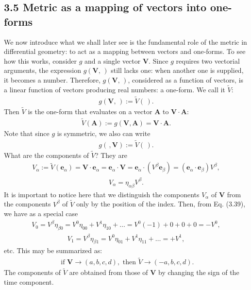 \documentclass[11pt,letterpaper]{book}
\begin{document}
    \subsection{3.5 Metric as a mapping of vectors into one-forms}
    We now introduce what we shall later see is the fundamental role of the metric in differential geometry: to act as a mapping between vectors and one-forms. To see how this works, consider \(g\) and a single vector \(\mathbf{V}\). Since \(g\) requires two vectorial arguments, the expression \(g(\mathbf{V}, \,)\) still lacks one: when another one is supplied, it becomes a number. Therefore, \(g(\mathbf{V}, \,)\), considered as a function of vectors, is a linear function of vectors producing real numbers: a one-form. We call it \(\tilde{V}\):
    \begin{align}
    g(\mathbf{V}, \,) := \tilde{V}( \,). \tag{3.37}
    \end{align}
    Then \(\tilde{V}\) is the one-form that evaluates on a vector \(\mathbf{A}\) to \(\mathbf{V} \cdot \mathbf{A}\):
    \begin{align}
    \tilde{V}(\mathbf{A}) := g(\mathbf{V},\mathbf{A}) = \mathbf{V} \cdot \mathbf{A}. \tag{3.38}
    \end{align}
    Note that since \(g\) is symmetric, we also can write
    \begin{align}
    g( \,, \mathbf{V}) := \tilde{V}( \,).
    \end{align}
    What are the components of \(\tilde{V}\)? They are
    \begin{align}
    V_\alpha := \tilde{V}(\mathbf{e}_\alpha) = \mathbf{V} \cdot \mathbf{e}_\alpha = \mathbf{e}_\alpha \cdot \mathbf{V}
    = \mathbf{e}_\alpha \cdot (V^\beta \mathbf{e}_\beta)
    = (\mathbf{e}_\alpha \cdot \mathbf{e}_\beta)V^\beta,
    \end{align}
    \begin{align}
    V_\alpha = \eta_{\alpha\beta}V^\beta. \tag{3.39}
    \end{align}
    It is important to notice here that we distinguish the components \(V_\alpha\) of \(\mathbf{V}\) from the components \(V^\beta\) of \(\tilde{V}\) only by the position of the index. Then, from Eq. (3.39), we have as a special case
    \begin{align}
    V_0 = V^\beta \eta_{\beta 0} = V^0 \eta_{00} + V^1 \eta_{10} + \dots 
    = V^0(-1) + 0 + 0 + 0 
    = -V^0, \tag{3.40}
    \end{align}
    \begin{align}
    V_1 = V^\beta \eta_{\beta 1} = V^0 \eta_{01} + V^1 \eta_{11} + \dots 
    = +V^1, \tag{3.41}
    \end{align}
    etc. This may be summarized as: 
    \begin{align}
    \text{ if } \mathbf{V} \rightarrow (a, b, c, d),
    \text{ then } \tilde{V} \rightarrow (-a, b, c, d). \tag{3.42}
    \end{align}
    The components of \(\tilde{V}\) are obtained from those of \(\mathbf{V}\) by changing the sign of the time component. 
    
\end{document}
